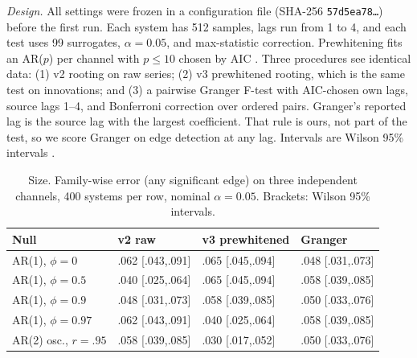 \documentclass[10pt,twocolumn,letterpaper]{article}
\theoremstyle{definition}
\theoremstyle{remark}
\newcommand{\code}[1]{\texttt{#1}}
\begin{document}
\textit{Design.} All settings were frozen in a configuration file (SHA-256
\code{57d5ea78\ldots}) before the first run. Each system has 512 samples, lags
run from 1 to 4, and each test uses 99 surrogates, $\alpha=0.05$, and
max-statistic correction. Prewhitening fits an AR($p$) per channel with
$p\le10$ chosen by AIC \cite{akaike}. Three procedures see identical data: (1)
v2 rooting on raw series; (2) v3 prewhitened rooting, which is the same test on
innovations; and (3) a pairwise Granger F-test with AIC-chosen own lags, source
lags 1--4, and Bonferroni correction over ordered pairs. Granger's reported lag
is the source lag with the largest coefficient. That rule is ours, not part of
the test, so we score Granger on edge detection at any lag. Intervals are
Wilson 95\% intervals \cite{wilson}.

\begin{table}[t]
\centering\footnotesize
\caption{Size. Family-wise error (any significant edge) on three independent
channels, 400 systems per row, nominal $\alpha=0.05$. Brackets: Wilson 95\%
intervals.}
\label{tab:size}
\setlength{\tabcolsep}{3.2pt}
\begin{tabular}{@{}llll@{}}
\toprule
Null & v2 raw & v3 prewhitened & Granger\\
\midrule
AR(1), $\phi=0$ & .062 [.043,.091] & .065 [.045,.094] & .048 [.031,.073]\\
AR(1), $\phi=0.5$ & .040 [.025,.064] & .065 [.045,.094] & .058 [.039,.085]\\
AR(1), $\phi=0.9$ & .048 [.031,.073] & .058 [.039,.085] & .050 [.033,.076]\\
AR(1), $\phi=0.97$ & .062 [.043,.091] & .040 [.025,.064] & .058 [.039,.085]\\
AR(2) osc., $r=.95$ & .058 [.039,.085] & .030 [.017,.052] & .050 [.033,.076]\\
\bottomrule
\end{tabular}
\end{table}
\end{document}
